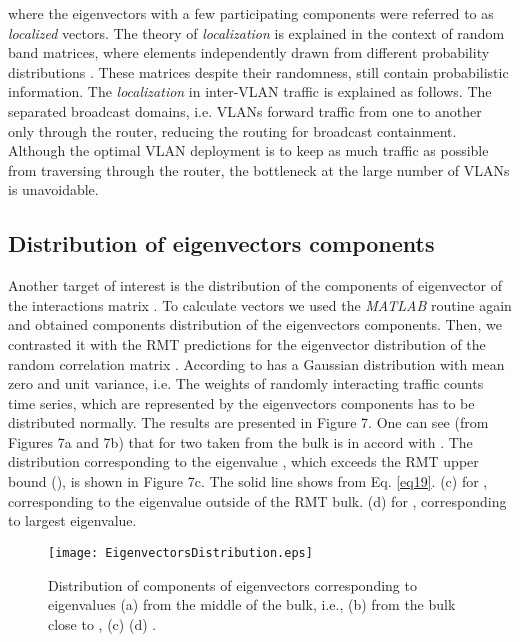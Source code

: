 \documentclass{IEEEtran}
\begin{document}
where the eigenvectors with a few participating components were referred
to as \emph{localized} vectors. The theory of \emph{localization}
is explained in the context of random band matrices, where elements
independently drawn from different probability distributions \cite{Guhr1}.
These matrices despite their randomness, still contain probabilistic
information. The \emph{localization} in inter-VLAN traffic is explained
as follows. The separated broadcast domains, i.e. VLANs forward traffic
from one to another only through the router, reducing the routing
for broadcast containment. Although the optimal VLAN deployment is
to keep as much traffic as possible from traversing through the router,
the bottleneck at the large number of VLANs is unavoidable.


\subsection{Distribution of eigenvectors components}

Another target of interest is the distribution of the components 
of eigenvector  of the interactions matrix . To calculate
vectors  we used the \emph{MATLAB} routine again and obtained
components distribution  of the eigenvectors components.
Then, we contrasted it with the RMT predictions for the eigenvector
distribution  of the random correlation matrix
. According to \cite{Guhr3}  has a Gaussian
distribution with mean zero and unit variance, i.e.
The weights of randomly interacting traffic counts time series, which
are represented by the eigenvectors components has to be distributed
normally. The results are presented in Figure 7. One can see (from
Figures 7a and 7b) that  for two  taken
from the bulk is in accord with . The distribution
 corresponding to the eigenvalue ,
which exceeds the RMT upper bound (), is
shown in Figure 7c. The solid line shows  from
Eq. \ref{eq19}. (c)  for , corresponding
to the eigenvalue outside of the RMT bulk. (d) 
for , corresponding to largest eigenvalue.\begin{figure}[H]
\begin{center}\texttt{[image: EigenvectorsDistribution.eps]}\end{center}


\caption{\label{7} Distribution of components  of eigenvectors
corresponding to eigenvalues (a) from the middle of the bulk, i.e.,
(b) from the bulk close to , (c)  (d)
.}
\end{figure}
\end{document}
